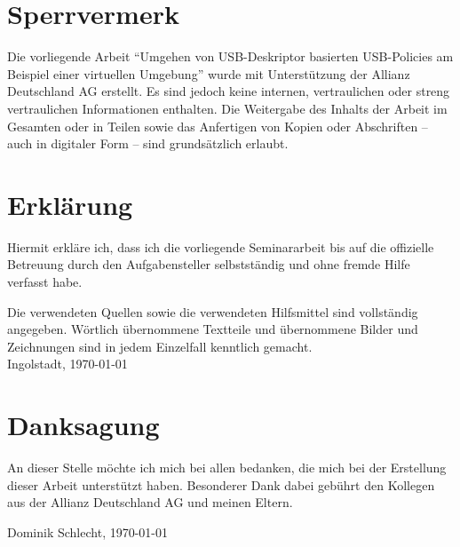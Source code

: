 

\chapter*{Sperrvermerk}
Die vorliegende Arbeit "`Umgehen von USB-Deskriptor basierten USB-Policies am Beispiel einer virtuellen Umgebung"' wurde mit Unterstützung der Allianz Deutschland AG erstellt. Es sind jedoch keine internen, vertraulichen oder streng vertraulichen Informationen enthalten. Die Weitergabe des Inhalts der Arbeit im Gesamten oder in Teilen sowie das Anfertigen von Kopien oder Abschriften -- auch in digitaler Form -- sind grunds\"{a}tzlich erlaubt.

\chapter*{Erkl\"{a}rung}
Hiermit erkl\"{a}re ich, dass ich die vorliegende Seminararbeit bis auf die offizielle Betreuung durch den Aufgabensteller selbstst\"{a}ndig und ohne fremde Hilfe verfasst habe.\par
Die verwendeten Quellen sowie die verwendeten Hilfsmittel sind vollst\"{a}ndig angegeben. W\"{o}rtlich \"{u}bernommene Textteile und \"{u}bernommene Bilder und Zeichnungen sind in jedem Einzelfall kenntlich gemacht. \\[10ex]
Ingolstadt, \today
{}

\chapter*{Danksagung}
An dieser Stelle möchte ich mich bei allen bedanken, die mich bei der Erstellung dieser Arbeit unterstützt haben. Besonderer Dank dabei gebührt den Kollegen aus der Allianz Deutschland AG und meinen Eltern.

\begin{flushright}
Dominik Schlecht, \today
\end{flushright}


